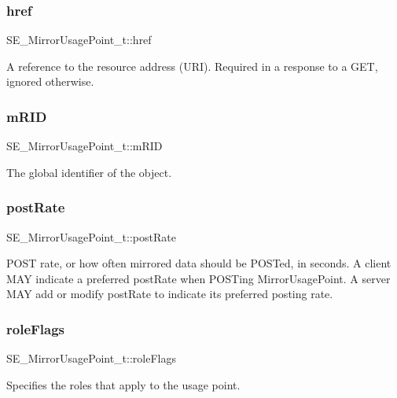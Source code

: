 \subsubsection{\texorpdfstring{href}{href}}
{\footnotesize\ttfamily S\+E\+\_\+\+Mirror\+Usage\+Point\+\_\+t\+::href}

A reference to the resource address (U\+RI). Required in a response to a G\+ET, ignored otherwise. \mbox{\label{group__MirrorUsagePoint_gacc4f91c3038a5cb63ddf1e7c6ee9f88c}} 
\subsubsection{\texorpdfstring{m\+R\+ID}{mRID}}
{\footnotesize\ttfamily S\+E\+\_\+\+Mirror\+Usage\+Point\+\_\+t\+::m\+R\+ID}

The global identifier of the object. \mbox{\label{group__MirrorUsagePoint_gaddaeaee61ed734dc07e57b9b0614d6f5}} 
\subsubsection{\texorpdfstring{post\+Rate}{postRate}}
{\footnotesize\ttfamily S\+E\+\_\+\+Mirror\+Usage\+Point\+\_\+t\+::post\+Rate}

P\+O\+ST rate, or how often mirrored data should be P\+O\+S\+Ted, in seconds. A client M\+AY indicate a preferred post\+Rate when P\+O\+S\+Ting Mirror\+Usage\+Point. A server M\+AY add or modify post\+Rate to indicate its preferred posting rate. \mbox{\label{group__MirrorUsagePoint_ga467c197b2446145027bcbe19c9a9ffea}} 
\subsubsection{\texorpdfstring{role\+Flags}{roleFlags}}
{\footnotesize\ttfamily S\+E\+\_\+\+Mirror\+Usage\+Point\+\_\+t\+::role\+Flags}

Specifies the roles that apply to the usage point. \mbox{\label{group__MirrorUsagePoint_gaf3b5785d54afaf564eab607a2b902671}} 
